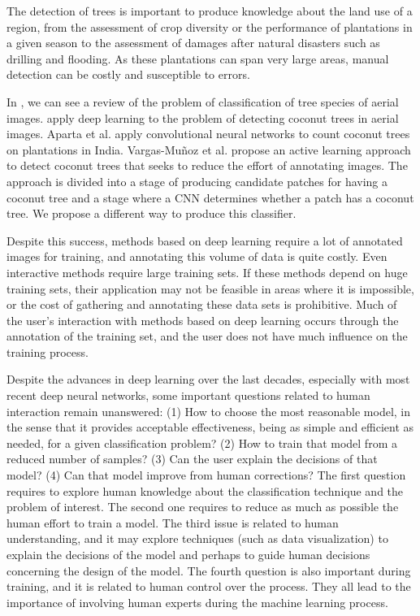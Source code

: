\documentclass[a4paper,conference]{IEEEtran}
\begin{document}
The detection of trees is important to produce knowledge about the land use of a region, from the assessment of crop diversity or the performance of plantations in a given season to the assessment of damages after natural disasters such as drilling and flooding. As these plantations can span very large areas, manual detection can be costly and susceptible to errors. 

In \cite{fassnacht2016review}, we can see a review of the problem of classification of tree species of aerial images. \cite{puttemans2018comparing} apply deep learning to the problem of detecting coconut trees in aerial images. Aparta et al. \cite{aparna2018cnn} apply convolutional neural networks to count coconut trees on plantations in India. Vargas-Muñoz et al. \cite{8899005} propose an active learning approach to detect coconut trees that seeks to reduce the effort of annotating images. The \cite{8899005} approach is divided into a stage of producing candidate patches for having a coconut tree and a stage where a CNN determines whether a patch has a coconut tree. We propose a different way to produce this classifier.  

Despite this success, methods based on deep learning require a lot of annotated images for training, and annotating this volume of data is quite costly. Even interactive methods require large training sets. If these methods depend on huge training sets, their application may not be feasible in areas where it is impossible, or the cost of gathering and annotating these data sets is prohibitive. Much of the user's interaction with methods based on deep learning occurs through the annotation of the training set, and the user does not have much influence on the training process.

Despite the advances in deep learning over the last decades, especially with most recent deep neural networks, some important questions related to human interaction remain unanswered: (1) How to choose the most reasonable model, in the sense that it provides acceptable effectiveness, being as simple and efficient as needed, for a given classification problem? (2) How to train that model from a reduced number of samples?  (3) Can the user explain the decisions of that model? (4) Can that model improve from human corrections? The first question requires to explore human knowledge about the classification technique and the problem of interest. The second one requires to reduce as much as possible the human effort to train a model. The third issue is related to human understanding, and it may explore techniques (such as data visualization) to explain the decisions of the model and perhaps to guide human decisions concerning the design of the model. The fourth question is also important during training, and it is related to human control over the process. They all lead to the importance of involving human experts during the machine learning process.
\end{document}
